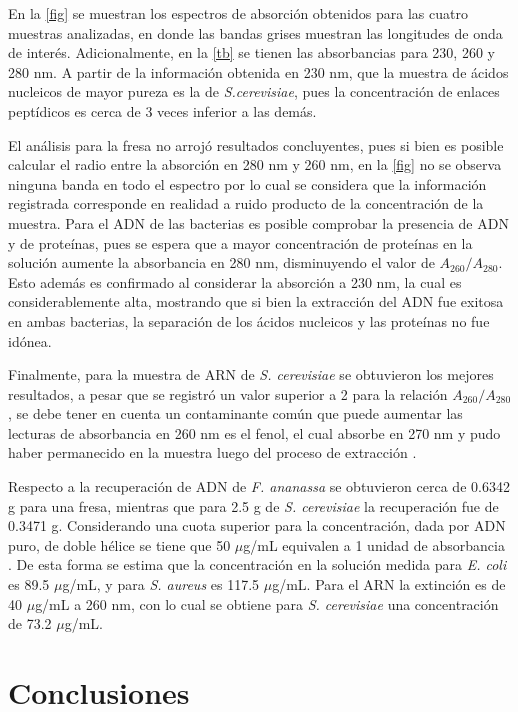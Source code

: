 \documentclass[fleqn,10pt]{SelfArx}
\begin{document}
	En la \autoref{fig} se muestran los espectros de absorción obtenidos para las cuatro muestras analizadas, en donde las bandas grises muestran las longitudes de onda de interés. Adicionalmente, en la \autoref{tb} se tienen las absorbancias para 230, 260 y 280 nm. A partir de la información obtenida en 230 nm, que la muestra de ácidos nucleicos de mayor pureza es la de \textit{S.cerevisiae}, pues la concentración de enlaces peptídicos es cerca de 3 veces inferior a las demás.

	El análisis para la fresa no arrojó resultados concluyentes, pues si bien es posible calcular el radio entre la absorción en 280 nm y 260 nm, en la \autoref{fig} no se observa ninguna banda en todo el espectro por lo cual se considera que la información registrada corresponde en realidad a ruido producto de la concentración de la muestra. Para el ADN de las bacterias es posible comprobar la presencia de ADN y de proteínas, pues se espera que a mayor concentración de proteínas en la solución aumente la absorbancia en 280 nm, disminuyendo el valor de $A_{260} / A_{280}$. Esto además es confirmado al considerar la absorción a 230 nm, la cual es considerablemente alta, mostrando que si bien la extracción del ADN fue exitosa en ambas bacterias, la separación de los ácidos nucleicos y las proteínas no fue idónea.
	
	Finalmente, para la muestra de ARN de \textit{S. cerevisiae} se obtuvieron los mejores resultados, a pesar que se registró un valor superior a 2 para la relación $A_{260} / A_{280}$, se debe tener en cuenta un contaminante com\'un que puede aumentar las lecturas de absorbancia en 260 nm es el fenol, el cual absorbe en 270 nm y pudo haber permanecido en la muestra luego del proceso de extracci\'on \cite{toni2018optimization}.
	
	Respecto a la recuperación de ADN de \textit{F. ananassa} se obtuvieron cerca de 0.6342 g para una fresa, mientras que para 2.5 g de \textit{S. cerevisiae} la recuperación fue de 0.3471 g. Considerando una cuota superior para la concentración, dada por ADN puro, de doble hélice se tiene que 50 $\mu$g/mL equivalen a 1 unidad de absorbancia \cite{sambrook2001molecular}. De esta forma se estima que la concentración en la solución medida para \textit{E. coli} es 89.5 $\mu$g/mL, y para \textit{S. aureus} es 117.5 $\mu$g/mL. Para el ARN la extinción es de 40 $\mu$g/mL a 260 nm, con lo cual se obtiene para \textit{S. cerevisiae} una concentración de 73.2 $\mu$g/mL.
\section{Conclusiones}
	



\end{document}
